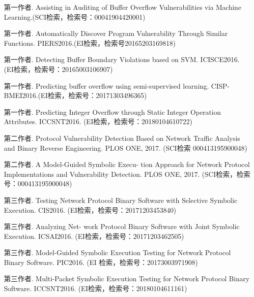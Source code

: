 \begin{resume}
\begin{enumerate}[{[}1{]}]
  \item 第一作者. Assisting in Auditing of Buffer Overflow Vulnerabilities via Machine Learning.(SCI检索，检索号：00041904420001)
  
  \item 第一作者. Automatically Discover Program Vulnerability Through Similar Functions. PIERS2016.(EI检索，检索号20165203169818)
  
  \item 第一作者. Detecting Buffer Boundary Violations based on SVM. ICISCE2016. (EI检索，检索号：20165003106907)
  
  \item 第一作者. Predicting buffer overflow using semi-supervised learning. CISP-BMEI2016.(EI检索，检索号：20171303496365)
  
  \item 第一作者. Predicting Integer Overflow through Static Integer Operation Attributes. ICCSNT2016. (EI检索，检索号：20180104610722)
  
  \item 第二作者. Protocol Vulnerability Detection Based on Network Traffic Analysis and Binary Reverse Engineering. PLOS ONE, 2017. (SCI检索 000413195900048)
    
  \item 第二作者. A Model-Guided Symbolic Execu-
  tion Approach for Network Protocol Implementations and Vulnerability Detection.
  PLOS ONE, 2017. (SCI检索，检索号：000413195900048)
  
  \item 第三作者. Testing Network
  Protocol Binary Software with Selective Symbolic Execution. CIS2016. (EI检索，检索号：20171203453840)
  
  \item 第三作者. Analyzing Net-
  work Protocol Binary Software with Joint Symbolic Execution. ICSAI2016. (EI检索，检索号：20171203462505)
  
  \item 第三作者. Model-Guided
  Symbolic Execution Testing for Network Protocol Binary Software. PIC2016. (EI
  检索，检索号：20173003971908)
  
  \item 第三作者. Multi-Packet
  Symbolic Execution Testing for Network Protocol Binary Software. ICCSNT2016.
  (EI检索，检索号：20180104611161)
  
  
  \end{enumerate}


\end{resume}
